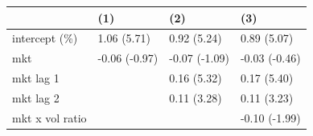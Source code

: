 \begin{tabular}{llll}
\toprule
 & (1) & (2) & (3) \\
\midrule
intercept (\%) & 1.06 (5.71) & 0.92 (5.24) & 0.89 (5.07) \\
mkt & -0.06 (-0.97) & -0.07 (-1.09) & -0.03 (-0.46) \\
mkt lag 1 &  & 0.16 (5.32) & 0.17 (5.40) \\
mkt lag 2 &  & 0.11 (3.28) & 0.11 (3.23) \\
mkt x vol ratio &  &  & -0.10 (-1.99) \\
\bottomrule
\end{tabular}
